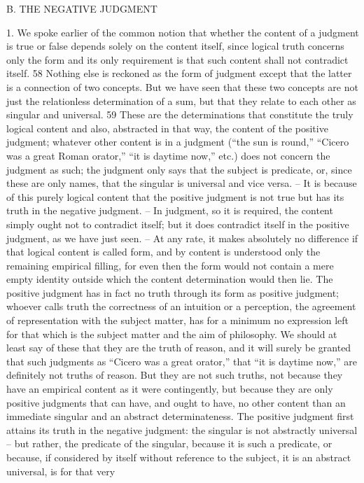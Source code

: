 B. THE NEGATIVE JUDGMENT

1. We spoke earlier of the common notion that whether the content of
a judgment is true or false depends solely on the content itself, since
logical truth concerns only the form and its only requirement is that such
content shall not contradict itself. 58 Nothing else is reckoned as the form
of judgment except that the latter is a connection of two concepts. But we
have seen that these two concepts are not just the relationless determination
of a sum, but that they relate to each other as singular and universal. 59 These
are the determinations that constitute the truly logical content and also,
abstracted in that way, the content of the positive judgment; whatever
other content is in a judgment (“the sun is round,” “Cicero was a great
Roman orator,” “it is daytime now,” etc.) does not concern the judgment
as such; the judgment only says that the subject is predicate, or, since these
are only names, that the singular is universal and vice versa. – It is because
of this purely logical content that the positive judgment is not true but
has its truth in the negative judgment. – In judgment, so it is required,
the content simply ought not to contradict itself; but it does contradict
itself in the positive judgment, as we have just seen. – At any rate, it
makes absolutely no difference if that logical content is called form, and
by content is understood only the remaining empirical filling, for even
then the form would not contain a mere empty identity outside which the
content determination would then lie. The positive judgment has in fact
no truth through its form as positive judgment; whoever calls truth the
correctness of an intuition or a perception, the agreement of representation
with the subject matter, has for a minimum no expression left for that
which is the subject matter and the aim of philosophy. We should at least
say of these that they are the truth of reason, and it will surely be granted
that such judgments as “Cicero was a great orator,” that “it is daytime
now,” are definitely not truths of reason. But they are not such truths, not
because they have an empirical content as it were contingently, but because
they are only positive judgments that can have, and ought to have, no other
content than an immediate singular and an abstract determinateness.
The positive judgment first attains its truth in the negative judgment:
the singular is not abstractly universal – but rather, the predicate of the
singular, because it is such a predicate, or because, if considered by itself
without reference to the subject, it is an abstract universal, is for that very
